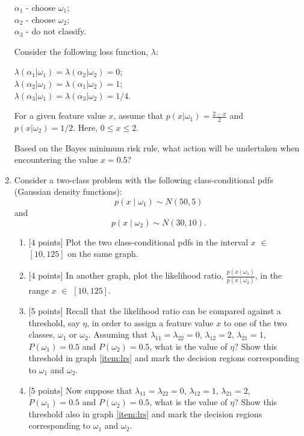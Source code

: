 \documentclass[11pt]{article}
\begin{document}
\begin{enumerate}
$\alpha_1$ -  choose $\omega_1$;\\
$\alpha_2$ -  choose $\omega_2$;\\
$\alpha_3$ - do not classify.

Consider the following loss function, $\lambda$:

$\lambda(\alpha_1|\omega_1) = \lambda(\alpha_2|\omega_2) = 0$;\\
$\lambda(\alpha_2|\omega_1) = \lambda(\alpha_1|\omega_2) = 1$;\\
$\lambda(\alpha_3|\omega_1) = \lambda(\alpha_3|\omega_2) = 1/4$.

For a given feature value $x$, assume that $p(x|\omega_1) = \frac{2-x}{2}$ and
$p(x|\omega_2) = 1/2$. Here, $0 \le x \le 2$. 

Based on the Bayes minimum risk rule, what action will be undertaken when encountering the value $x = 0.5$?


\item Consider a two-class problem with the following class-conditional pdfs (Gaussian density functions):
\[
p(x \mid \omega_1) \sim N(50, 5)
\]
and 
\[
p(x \mid \omega_2) \sim N(30,10).
\]

\begin{enumerate}
\item{\label{item:pdfs}[4 points]} Plot the two class-conditional pdfs in the interval $x$ $\in$ $[10, 125]$ on the same graph.

\item{\label{item:lrs}[4 points]} In another graph, plot the likelihood ratio, $\frac{p(x \mid \omega_1)}{p(x \mid \omega_2)}$, in the range $x$ $\in$ $[10, 125]$.

\item{\label{it:loss1}[5 points]} Recall that the likelihood ratio can be compared against a threshold, say $\eta$, in order to assign a feature value $x$ to one of the two classes, $\omega_1$ or $\omega_2$. Assuming that $\lambda_{11} = \lambda_{22} = 0$, $\lambda_{12} = 2$, $\lambda_{21} = 1$, $P(\omega_1)=0.5$ and $P(\omega_2)=0.5$, what is the value of $\eta$?  Show this threshold in graph \ref{item:lrs} and mark the decision regions corresponding to $\omega_1$ and $\omega_2$. 

\item{\label{it:loss2}[5 points]} Now suppose that $\lambda_{11} = \lambda_{22} = 0$, $\lambda_{12} = 1$, $\lambda_{21} = 2$, $P(\omega_1)=0.5$ and $P(\omega_2)=0.5$, what is the value of $\eta$? Show this threshold also in graph \ref{item:lrs} and mark the decision regions corresponding to $\omega_1$ and $\omega_2$.


\end{enumerate}
\end{enumerate}
\end{document}
